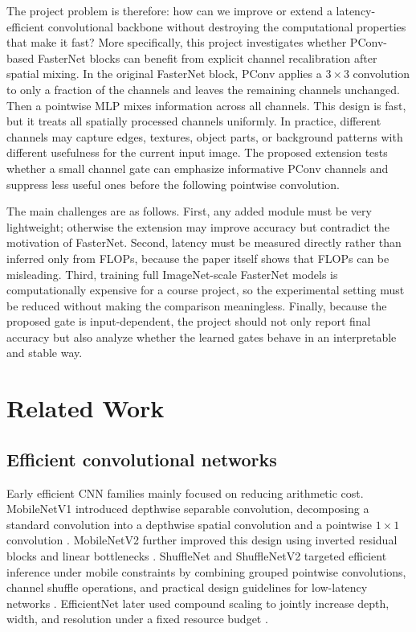 \documentclass{article}
\begin{document}
The project problem is therefore: how can we improve or extend a latency-efficient convolutional backbone without destroying the computational properties that make it fast? More specifically, this project investigates whether PConv-based FasterNet blocks can benefit from explicit channel recalibration after spatial mixing. In the original FasterNet block, PConv applies a $3 \times 3$ convolution to only a fraction of the channels and leaves the remaining channels unchanged. Then a pointwise MLP mixes information across all channels. This design is fast, but it treats all spatially processed channels uniformly. In practice, different channels may capture edges, textures, object parts, or background patterns with different usefulness for the current input image. The proposed extension tests whether a small channel gate can emphasize informative PConv channels and suppress less useful ones before the following pointwise convolution.

The main challenges are as follows. First, any added module must be very lightweight; otherwise the extension may improve accuracy but contradict the motivation of FasterNet. Second, latency must be measured directly rather than inferred only from FLOPs, because the paper itself shows that FLOPs can be misleading. Third, training full ImageNet-scale FasterNet models is computationally expensive for a course project, so the experimental setting must be reduced without making the comparison meaningless. Finally, because the proposed gate is input-dependent, the project should not only report final accuracy but also analyze whether the learned gates behave in an interpretable and stable way.

\section{Related Work}

\subsection{Efficient convolutional networks}

Early efficient CNN families mainly focused on reducing arithmetic cost. MobileNetV1 introduced depthwise separable convolution, decomposing a standard convolution into a depthwise spatial convolution and a pointwise $1 \times 1$ convolution \citep{howard2017mobilenets}. MobileNetV2 further improved this design using inverted residual blocks and linear bottlenecks \citep{sandler2018mobilenetv2}. ShuffleNet and ShuffleNetV2 targeted efficient inference under mobile constraints by combining grouped pointwise convolutions, channel shuffle operations, and practical design guidelines for low-latency networks \citep{zhang2018shufflenet,ma2018shufflenetv2}. EfficientNet later used compound scaling to jointly increase depth, width, and resolution under a fixed resource budget \citep{tan2019efficientnet}.
\end{document}
